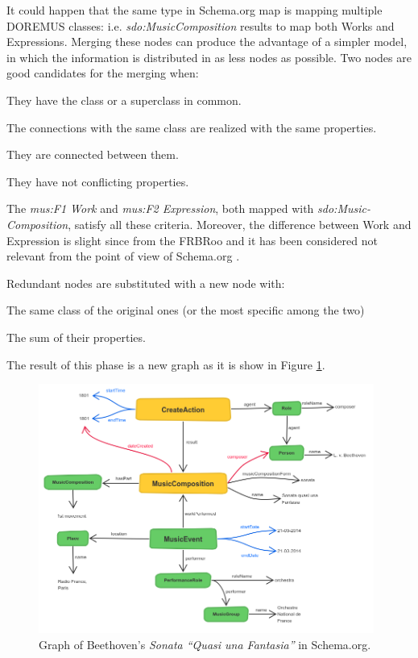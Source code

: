 \documentclass{llncs}
\begin{document}
It could happen that the same type in Schema.org map is mapping multiple DOREMUS classes: i.e. \textit{sdo:MusicComposition} results to map both Works and Expressions. Merging these nodes can produce the advantage of a simpler model, in which the information is distributed in as less nodes as possible. Two nodes are good candidates for the merging when:
\begin{enumerate*}
\item{They have the class or a superclass in common.}
\item{The connections with the same class are realized with the same properties.}
\item{They are connected between them.}
\item{They have not conflicting properties.}
\end{enumerate*} The \textit{mus:F1 Work} and \textit{mus:F2 Expression}, both mapped with \textit{sdo:Music-Composition}, satisfy all these criteria. Moreover, the difference between Work and Expression is slight since from the FRBRoo and it has been considered not relevant from the point of view of Schema.org \cite{godby2013relationship}.

Redundant nodes are substituted with a new node with:
\begin{enumerate*}
\item{The same class of the original ones (or the most specific among the two)}
\item{The sum of their properties.}
\end{enumerate*}
The result of this phase is a new graph as it is show in Figure \ref{fig:beet-schema}.

\begin{figure}
\centering
\includegraphics[width=11cm]{img/Beethoven-Schema.png}
\caption{Graph of Beethoven's \textit{Sonata ``Quasi una Fantasia''} in Schema.org.}
\label{fig:beet-schema}
\end{figure}
\end{document}
